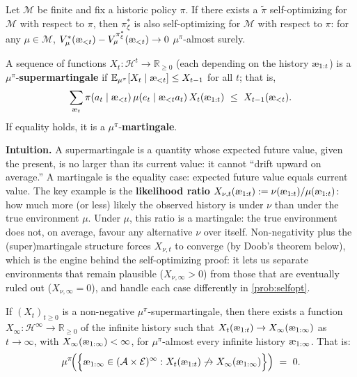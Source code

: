 \documentclass[fontsize=11pt, parskip=half]{scrartcl}
\newcommand{\cA}{\mathcal{A}}
\newcommand{\cE}{\mathcal{E}}
\newcommand{\cH}{\mathcal{H}}
\newcommand{\cM}{\mathcal{M}}
\newcommand{\Ex}{\mathbb{E}}
\newcommand{\aes}{\textnormal{\ae}}
\begin{document}
\begin{theorem}\label{thm:selfopt}
Let $\cM$ be finite and fix a historic policy $\pi$.
If there exists a $\tilde\pi$ self-optimizing for $\cM$ with respect to $\pi$, then $\pi_\xi^*$ is also self-optimizing for $\cM$ with respect to $\pi$: for any $\mu \in \cM$,
$V_\mu^*(\aes_{<t}) - V_\mu^{\pi_\xi^*}(\aes_{<t}) \to 0$ $\mu^\pi$-almost surely.
\end{theorem}

\begin{definition}[Supermartingale]\label{def:supermartingale}
A sequence of functions $X_t : \cH^{t} \to \mathbb{R}_{\geq 0}$ (each depending on the history $\aes_{1:t}$) is a $\mu^\pi$-\textbf{supermartingale} if
$\Ex_{\mu^\pi}[X_t \mid \aes_{<t}] \leq X_{t-1}$ for all $t$; that is,
\[
    \sum_{\aes_t} \pi(a_t \mid \aes_{<t})\, \mu(e_t \mid \aes_{<t} a_t)\, X_t(\aes_{1:t}) ~\leq~ X_{t-1}(\aes_{<t}).
\]
If equality holds, it is a $\mu^\pi$-\textbf{martingale}.
\end{definition}

\textbf{Intuition.}
A supermartingale is a quantity whose expected future value, given the present, is no larger than its current value: it cannot ``drift upward on average.'' A martingale is the equality case: expected future value equals current value.
The key example is the \textbf{likelihood ratio} $X_{\nu,t}(\aes_{1:t}) := \nu(\aes_{1:t})/\mu(\aes_{1:t})$: how much more (or less) likely the observed history is under $\nu$ than under the true environment $\mu$.
Under $\mu$, this ratio is a martingale: the true environment does not, on average, favour any alternative $\nu$ over itself.
Non-negativity plus the (super)martingale structure forces $X_{\nu,t}$ to converge (by Doob's theorem below), which is the engine behind the self-optimizing proof: it lets us separate environments that remain plausible ($X_{\nu,\infty} > 0$) from those that are eventually ruled out ($X_{\nu,\infty} = 0$), and handle each case differently in \cref{prob:selfopt}.

\begin{fact}\label{fact:doob}
If $(X_t)_{t \geq 0}$ is a non-negative $\mu^\pi$-supermartingale, then there exists a function $X_\infty : \cH^\infty \to \mathbb{R}_{\geq 0}$ of the infinite history such that $X_t(\aes_{1:t}) \to X_\infty(\aes_{1:\infty})$ as $t \to \infty$, with $X_\infty(\aes_{1:\infty}) < \infty$, for $\mu^\pi$-almost every infinite history $\aes_{1:\infty}$.
That is:
\[
    \mu^\pi\!\Big(\Big\{\aes_{1:\infty} \in (\cA \times \cE)^\infty : X_t(\aes_{1:t}) \not\to X_\infty(\aes_{1:\infty})\Big\}\Big) ~=~ 0.
\]
\end{fact}
\end{document}
